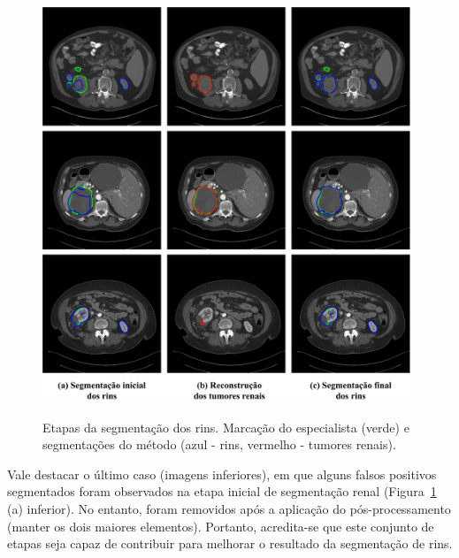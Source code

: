 \begin{figure}[!ht]
    \centering
    \caption{Etapas da segmentação dos rins. Marcação do especialista (verde) e segmentações do método (azul - rins, vermelho - tumores renais).}
    \includegraphics[width=0.98\textwidth]{figuras/res-seg-rins-final.pdf}
    \label{fig:res-final-rins}
\end{figure}

Vale destacar o último caso (imagens inferiores), em que alguns falsos positivos segmentados foram observados na etapa inicial de segmentação renal (Figura~\ref{fig:res-final-rins} (a) inferior). No entanto, foram removidos após a aplicação do pós-processamento (manter os dois maiores elementos). Portanto, acredita-se que este conjunto de etapas seja capaz de contribuir para melhorar o resultado da segmentação de rins.



